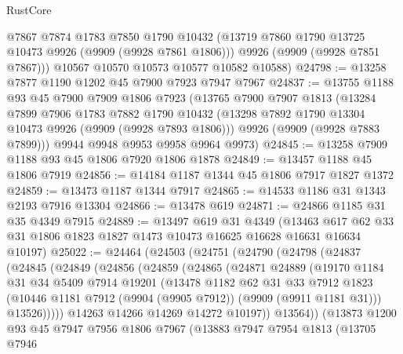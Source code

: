 \begin{lexlean}{RustCore}
\begin{coremodule}
        @7867
        @7874
        @1783
        @7850
        @1790
        @10432
        (@13719 @7860 @1790 @13725 @10473 @9926 (@9909 (@9928 @7861 @1806)))
        @9926
        (@9909 (@9928 @7851 @7867)))
      @10567
      @10570
      @10573
      @10577
      @10582
      @10588)
@24798 := @13258 @7877 @1190 @1202 @45 @7900 @7923 @7947 @7967
@24837 := @13755
    @1188
    @93
    @45
    @7900
    @7909
    @1806
    @7923
    (@13765
      @7900
      @7907
      @1813
      (@13284
        @7899
        @7906
        @1783
        @7882
        @1790
        @10432
        (@13298 @7892 @1790 @13304 @10473 @9926 (@9909 (@9928 @7893 @1806)))
        @9926
        (@9909 (@9928 @7883 @7899)))
      @9944
      @9948
      @9953
      @9958
      @9964
      @9973)
@24845 := @13258 @7909 @1188 @93 @45 @1806 @7920 @1806 @1878
@24849 := @13457 @1188 @45 @1806 @7919
@24856 := @14184 @1187 @1344 @45 @1806 @7917 @1827 @1372
@24859 := @13473 @1187 @1344 @7917
@24865 := @14533 @1186 @31 @1343 @2193 @7916 @13304
@24866 := @13478 @619
@24871 := @24866 @1185 @31 @35 @4349 @7915
@24889 := @13497
    @619
    @31
    @4349
    (@13463 @617 @62 @33 @31 @1806 @1823 @1827 @1473 @10473 @16625 @16628 @16631 @16634 @10197)
@25022 := @24464
    (@24503
      (@24751
        (@24790
          (@24798
            (@24837
              (@24845
                (@24849
                  (@24856
                    (@24859
                      (@24865
                        (@24871
                          @24889
                          (@19170
                            @1184
                            @31
                            @34
                            @5409
                            @7914
                            @19201
                            (@13478
                              @1182
                              @62
                              @31
                              @33
                              @7912
                              @1823
                              (@10446 @1181 @7912 (@9904 (@9905 @7912)) (@9909 (@9911 @1181 @31)))
                              @13526)))))
                    @14263
                    @14266
                    @14269
                    @14272
                    @10197))
                @13564))
            (@13873
              @1200
              @93
              @45
              @7947
              @7956
              @1806
              @7967
              (@13883
                @7947
                @7954
                @1813
                (@13705
                  @7946

\end{coremodule}
\end{lexlean}
